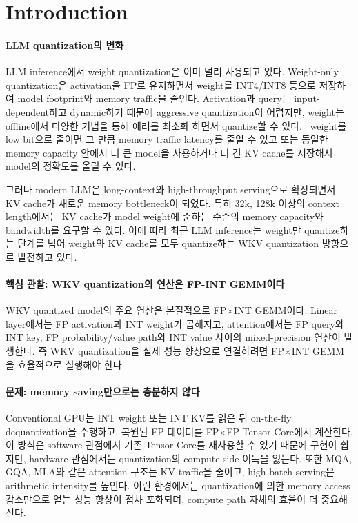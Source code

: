 \documentclass[11pt]{article}
\newcommand{\todo}[1]{\textcolor{red}{[TODO: #1]}}
\newcommand{\fpint}{FP$\times$INT}
\newcommand{\wkv}{WKV}
\begin{document}
\section{Introduction}

\paragraph{LLM quantization의 변화}
LLM inference에서 weight quantization은 이미 널리 사용되고 있다.
Weight-only quantization은 activation을 FP로 유지하면서 weight를 INT4/INT8 등으로 저장하여 model footprint와 memory traffic을 줄인다.
Activation과 query는 input-dependent하고 dynamic하기 때문에 aggressive quantization이 어렵지만, weight는 offline에서 다양한 기법을 통해 에러를 최소화 하면서 quantize할 수 있다.~\cite{frantar2022gptq,lin2023awq,dettmers2023spqr,kim2023squeezellm,lee2023owq,kim2023finequant,shao2023omniquant,chee2023quip,tseng2024quipsharp,shang2023pbllm,egiazarian2024aqlm,huang2024billm,malinovskii2024pvtuning,tseng2024qtip,liu2024vptq,luo2024daq,lee2024lrq,yan2026d2quant,xu2025butterflyquant,liu2024spinquant}
weight를 low bit으로 줄이면 그 만큼 memory traffic latency를 줄일 수 있고 또는 동일한 memory capacity 안에서 더 큰 model을 사용하거나 더 긴 KV cache를 저장해서 model의 정확도를 올릴 수 있다.

그러나 modern LLM은 long-context와 high-throughput serving으로 확장되면서 KV cache가 새로운 memory bottleneck이 되었다.
특히 32k, 128k 이상의 context length에서는 KV cache가 model weight에 준하는 수준의 memory capacity와 bandwidth를 요구할 수 있다.
이에 따라 최근 LLM inference는 weight만 quantize하는 단계를 넘어 weight와 KV cache를 모두 quantize하는 \wkv{} quantization 방향으로 발전하고 있다.

\paragraph{핵심 관찰: WKV quantization의 연산은 FP-INT GEMM이다}
\wkv{} quantized model의 주요 연산은 본질적으로 \fpint{} GEMM이다.
Linear layer에서는 FP activation과 INT weight가 곱해지고, attention에서는 FP query와 INT key, FP probability/value path와 INT value 사이의 mixed-precision 연산이 발생한다.
즉 \wkv{} quantization을 실제 성능 향상으로 연결하려면 \fpint{} GEMM을 효율적으로 실행해야 한다.

\paragraph{문제: memory saving만으로는 충분하지 않다}
Conventional GPU는 INT weight 또는 INT KV를 읽은 뒤 on-the-fly dequantization을 수행하고, 복원된 FP 데이터를 FP$\times$FP Tensor Core에서 계산한다.
이 방식은 software 관점에서 기존 Tensor Core를 재사용할 수 있기 때문에 구현이 쉽지만, hardware 관점에서는 quantization의 compute-side 이득을 잃는다.
또한 MQA, GQA, MLA와 같은 attention 구조는 KV traffic을 줄이고, high-batch serving은 arithmetic intensity를 높인다.
이런 환경에서는 quantization에 의한 memory access 감소만으로 얻는 성능 향상이 점차 포화되며, compute path 자체의 효율이 더 중요해진다.
\end{document}
